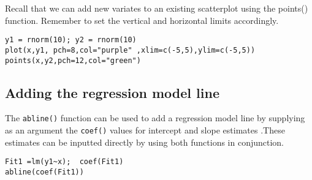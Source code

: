 \begin{frame}
\normalsize
Recall that we can add new variates to an existing scatterplot using the points() function. Remember to set the vertical and horizontal limits accordingly.
\footnotesize \begin{verbatim}
y1 = rnorm(10); y2 = rnorm(10)
plot(x,y1, pch=8,col="purple" ,xlim=c(-5,5),ylim=c(-5,5))
points(x,y2,pch=12,col="green")
\end{verbatim}\normalsize

\end{frame}
\begin{frame}


\subsection{Adding the regression model line}

The \texttt{abline()} function can be used to add a regression model line  by supplying as an argument the \texttt{coef()} values for intercept and slope estimates .These estimates can be inputted directly by using both functions in conjunction.

\footnotesize \begin{verbatim}
Fit1 =lm(y1~x);  coef(Fit1)
abline(coef(Fit1))	
\end{verbatim}\normalsize
\end{frame}
